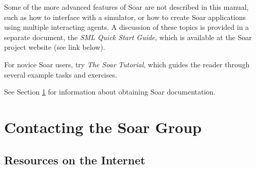 Some of the more advanced features of Soar are not described in this
manual, such as how to interface with a simulator, or how to create Soar
applications using multiple interacting agents.  A discussion of
these topics is provided in a separate document, the \textit{SML Quick Start Guide}, 
which is available at the Soar project website (see link below).

For novice Soar users, try \textit{The Soar} \textit{\SoarVersionMajor} \textit{Tutorial}, which guides the reader 
through several example tasks and exercises.

See Section \ref{CONTACT} for information about obtaining Soar documentation.

%
%
\section{Contacting the Soar Group}
\label{CONTACT}

\subsection*{Resources on the Internet}

